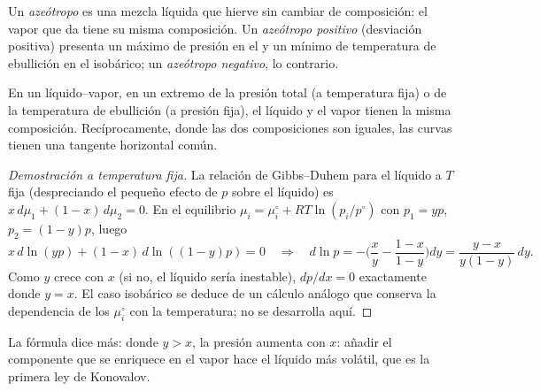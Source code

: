 \begin{definition}[Azeótropo]\label{def:b2:liquid-vapour-diagrams:azeotrope}
Un \emph{azeótropo} es una mezcla líquida que hierve sin
cambiar de composición: el vapor que da tiene su misma composición. Un
\emph{azeótropo positivo} (desviación positiva) presenta
un máximo de presión en el  y un mínimo de temperatura de
ebullición en el isobárico; un \emph{azeótropo negativo},
lo contrario.
\end{definition}

\begin{theorem}\label{thm:b2:liquid-vapour-diagrams:konovalov}
En un  líquido--vapor, en un extremo de la presión total (a
temperatura fija) o de la temperatura de ebullición (a presión fija), el
líquido y el vapor tienen la misma composición. Recíprocamente, donde las
dos composiciones son iguales, las curvas tienen una tangente horizontal común.
\end{theorem}

\begin{proof}[Demostración a temperatura fija]
La relación de Gibbs--Duhem para el líquido a $T$ fija (despreciando el pequeño efecto de $p$
sobre el líquido) es $x\,d\mu_1 + (1 - x)\,d\mu_2 = 0$. En el equilibrio
$\mu_i = \mu_i^\circ + RT\ln(p_i/p^\circ)$ con $p_1 = yp$, $p_2 = (1 - y)p$, luego
\[
  x\,d\ln(yp) + (1 - x)\,d\ln((1 - y)p) = 0
  \quad\Longrightarrow\quad
  d\ln p = -\Big(\frac{x}{y} - \frac{1 - x}{1 - y}\Big)dy
  = \frac{y - x}{y(1 - y)}\,dy .
\]
Como $y$ crece con $x$ (si no, el líquido sería inestable),
$dp/dx = 0$ exactamente donde $y = x$. El caso isobárico se deduce de un cálculo
análogo que conserva la dependencia de los $\mu_i^\circ$ con la temperatura; no se
desarrolla aquí.
\end{proof}

La fórmula dice más: donde $y > x$, la presión aumenta con $x$:
añadir el componente que se enriquece en el vapor hace el líquido más
volátil, que es la primera ley de Konovalov.

